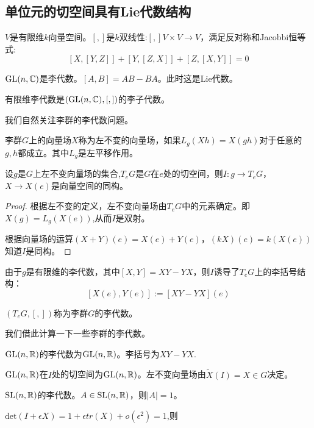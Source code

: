 \subsection{单位元的切空间具有Lie代数结构}
\begin{definition}[李代数]
    $V$是有限维$k$向量空间。$[,]$是$k$双线性:$[,]V \times V \to V$，满足反对称和Jacobbi恒等式:
    $$
    [X,[Y,Z]]+[Y,[Z,X]]+[Z,[X,Y]]=0
    $$

\end{definition}
\begin{example}
    $\mathrm{GL}(n,\mathbb{C})$是李代数。$[A,B]=AB-BA$。此时这是Lie代数。
\end{example}
\begin{theorem}[Ado定理]
    有限维李代数是$(\mathrm{GL}(n,\mathbb{C}),[,])$的李子代数。
\end{theorem}

我们自然关注李群的李代数问题。
\begin{definition}[左不变向量场]
    李群$G$上的向量场$X$称为左不变的向量场，如果$L_g(Xh)=X(gh)$对于任意的$g,h$都成立。其中$L_g$是左平移作用。
\end{definition}
\begin{proposition}
    设$g$是$G$上左不变向量场的集合,$T_eG$是$G$在$e$处的切空间，则$I:g \to T_eG$，$X \to X(e)$是向量空间的同构。
\end{proposition}
\begin{proof}
    根据左不变的定义，左不变向量场由$T_eG$中的元素确定。即$X(g)=L_g(X(e))$,从而$I$是双射。

    根据向量场的运算$(X+Y)(e)=X(e)+Y(e)$，$(kX)(e)=k(X(e))$知道$I$是同构。
\end{proof}
由于$g$是有限维的李代数，其中$[X,Y]=XY-YX$，则$I$诱导了$T_e G$上的李括号结构：
$$
[X(e),Y(e)]:=[XY-YX](e)
$$
\begin{definition}
    $(T_e G,[,])$称为李群$G$的李代数。
\end{definition}

我们借此计算一下一些李群的李代数。
\begin{example}
    $\mathrm{GL}(n,\mathbb{R})$的李代数为$\mathrm{GL}(n,\mathbb{R})$。李括号为$XY-YX$.

    $\mathrm{GL}(n,\mathbb{R})$在$I$处的切空间为$\mathrm{GL}(n,\mathbb{R})$。左不变向量场由$\tilde{X}(I)=X \in G$决定。
\end{example}
\begin{example}
    $\mathrm{SL}(n,\mathbb{R})$的李代数。$A \in \mathrm{SL}(n,\mathbb{R})$，则$|A|=1$。

    $\mathrm{det}(I+\epsilon X)=1+\epsilon tr(X)+o(\epsilon^2)=1$,则
\end{example}
\begin{example}
    
\end{example}
